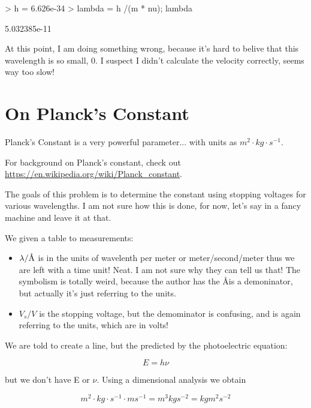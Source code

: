 \documentclass{article}
\newcommand{\angstrom}{\textup{\AA}}
\begin{document}
\begin{Schunk}
\begin{Sinput}
> h = 6.626e-34
> lambda = h /(m * nu); lambda
\end{Sinput}
\begin{Soutput}
[1] 5.032385e-11
\end{Soutput}
\end{Schunk}

At this point, I am doing something wrong, because it's hard to belive that this wavelength is so small, 0. I suspect I didn't calculate the velocity correctly, seems way too slow!

\section{On Planck's Constant}

Planck's Constant is a very powerful parameter... with units as $m^2 \cdot kg \cdot s^{-1}$. 

For background on Planck's constant, check out \url{https://en.wikipedia.org/wiki/Planck_constant}. 

The goals of this problem is to determine the constant using stopping voltages for various wavelengths. I am not sure how this is done, for now, let's say in a fancy machine and leave it at that.

We given a table to measurements: 
\begin{itemize}
\item $\lambda/\angstrom$ is in the units of wavelenth per meter or meter/second/meter thus we are left with a time unit! Neat. I am not sure why they can tell us that!  The symbolism is totally weird, because the author has the \angstrom is a demoninator, but actually it's just referring to the units. 

\item $V_s/V$ is the stopping voltage, but the demominator is confusing, and is again referring to the units, which are in volts!
\end{itemize}

We are told to create a line, but the predicted by the photoelectric equation: 

\begin{equation}
E = h \nu
\end{equation}

\noindent but we don't have E or $\nu$. Using a dimensional analysis we obtain

\begin{equation}
m^2 \cdot kg \cdot s^{-1} \cdot m s^{-1} = m^3 kg s^{-2} = kg m^2 s^{-2}
\end{equation}
\end{document}
